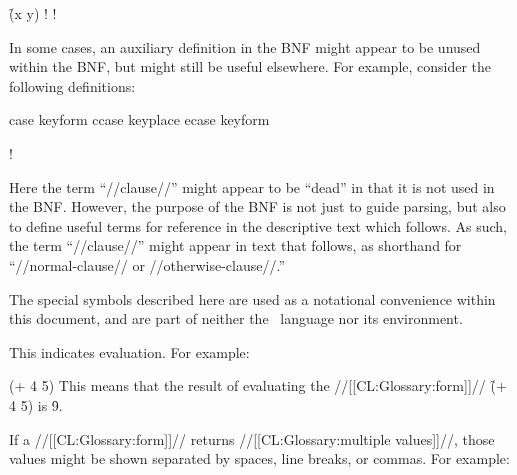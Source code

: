 \f{(x  y)} \Vskip 1pc!  \Vskip 1pc!

\endsubsubsubsection%


In some cases, an auxiliary definition in the BNF might appear to be unused within the BNF, but might still be useful elsewhere.  For example, consider the following definitions:

\DefmacWithValues case 		  {keyform   } 		  {} \DefmacWithValues ccase 		  {keyplace } 		  {} \DefmacWithValues ecase 		  {keyform  } 		  {}

   \Vskip 1pc!

Here the term ``//clause//'' might appear to be ``dead'' in that it is not used in the BNF.  However, the purpose of the BNF is not just to guide parsing, but also to define useful terms for reference in the descriptive text which follows. As such, the term ``//clause//'' might appear in text that follows, as shorthand for ``//normal-clause// or //otherwise-clause//.''

\endsubsubsubsection%

\endsubsubsection%


The special symbols described here are used as a notational convenience within this document, and are part of neither the \clisp\ language nor its environment.

\beginlist \itemitem{\EV}

This indicates evaluation. For example:

\code
 (+ 4 5)   \endcode This means that the result of evaluating the //[[CL:Glossary:form]]// \f{(+ 4 5)} is \f{9}.
                                                                 

If a //[[CL:Glossary:form]]// returns //[[CL:Glossary:multiple values]]//, those values might be shown separated by spaces, line breaks, or commas. For example:


